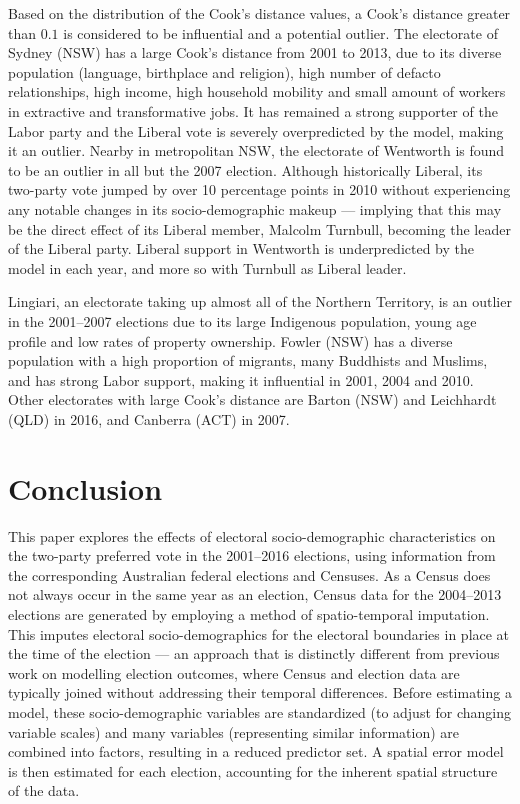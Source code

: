 \documentclass[11pt,a4paper,]{article}
\begin{document}
Based on the distribution of the Cook's distance values, a Cook's distance greater than \(0.1\) is considered to be influential and a potential outlier. The electorate of Sydney (NSW) has a large Cook's distance from 2001 to 2013, due to its diverse population (language, birthplace and religion), high number of defacto relationships, high income, high household mobility and small amount of workers in extractive and transformative jobs. It has remained a strong supporter of the Labor party and the Liberal vote is severely overpredicted by the model, making it an outlier. Nearby in metropolitan NSW, the electorate of Wentworth is found to be an outlier in all but the 2007 election. Although historically Liberal, its two-party vote jumped by over 10 percentage points in 2010 without experiencing any notable changes in its socio-demographic makeup --- implying that this may be the direct effect of its Liberal member, Malcolm Turnbull, becoming the leader of the Liberal party. Liberal support in Wentworth is underpredicted by the model in each year, and more so with Turnbull as Liberal leader.

Lingiari, an electorate taking up almost all of the Northern Territory, is an outlier in the 2001--2007 elections due to its large Indigenous population, young age profile and low rates of property ownership. Fowler (NSW) has a diverse population with a high proportion of migrants, many Buddhists and Muslims, and has strong Labor support, making it influential in 2001, 2004 and 2010. Other electorates with large Cook's distance are Barton (NSW) and Leichhardt (QLD) in 2016, and Canberra (ACT) in 2007.

\hypertarget{conclusion}{%
\section{Conclusion}\label{conclusion}}

This paper explores the effects of electoral socio-demographic characteristics on the two-party preferred vote in the 2001--2016 elections, using information from the corresponding Australian federal elections and Censuses. As a Census does not always occur in the same year as an election, Census data for the 2004--2013 elections are generated by employing a method of spatio-temporal imputation. This imputes electoral socio-demographics for the electoral boundaries in place at the time of the election --- an approach that is distinctly different from previous work on modelling election outcomes, where Census and election data are typically joined without addressing their temporal differences. Before estimating a model, these socio-demographic variables are standardized (to adjust for changing variable scales) and many variables (representing similar information) are combined into factors, resulting in a reduced predictor set. A spatial error model is then estimated for each election, accounting for the inherent spatial structure of the data.
\end{document}

